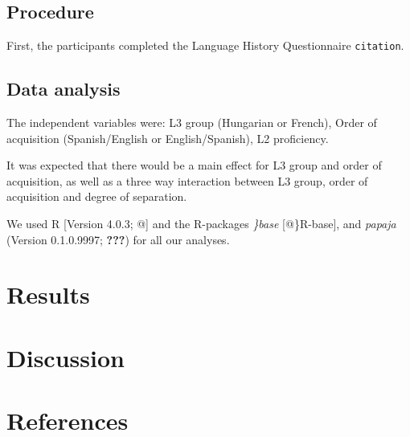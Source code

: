 \documentclass[
  english,
  man]{apa6}
\begin{document}
\hypertarget{procedure}{%
\subsection{Procedure}\label{procedure}}

First, the participants completed the Language History Questionnaire \texttt{citation}.

\hypertarget{data-analysis}{%
\subsection{Data analysis}\label{data-analysis}}

The independent variables were: L3 group (Hungarian or French), Order of acquisition (Spanish/English or English/Spanish), L2 proficiency.

It was expected that there would be a main effect for L3 group and order of acquisition, as well as a three way interaction between L3 group, order of acquisition and degree of separation.

We used R {[}Version 4.0.3; @{]} and the R-packages \emph{\}base} {[}@\}R-base{]}, and \emph{papaja} (Version 0.1.0.9997; {\textbf{???}}) for all our analyses.

\hypertarget{results}{%
\section{Results}\label{results}}

\hypertarget{discussion}{%
\section{Discussion}\label{discussion}}

\newpage

\hypertarget{references}{%
\section{References}\label{references}}

\begingroup
\setlength{\parindent}{-0.5in}
\setlength{\leftskip}{0.5in}

\hypertarget{refs}{}

\endgroup
\end{document}
